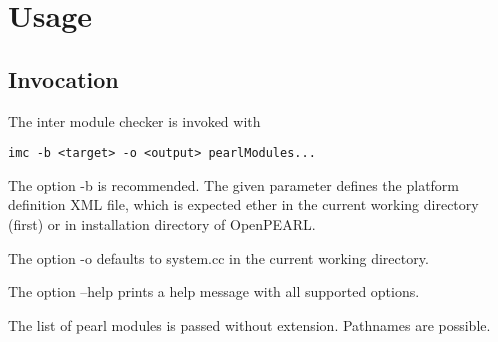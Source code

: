 \chapter{Usage}

\section{Invocation}
The inter module checker is invoked with
\begin{verbatim}
imc -b <target> -o <output> pearlModules...
\end{verbatim}

The option -b is  recommended. The given parameter defines the
platform definition XML file, which is expected ether in the current 
working directory (first)
or in installation directory of OpenPEARL.

The option -o defaults to system.cc in the current working directory.

The option --help prints a help message with all supported options.

The list of pearl modules is passed without extension. Pathnames are 
possible.



